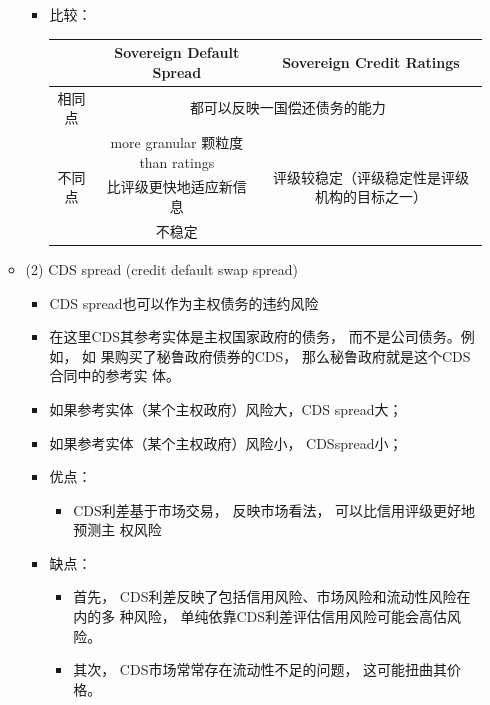 \begin{itemize}
\begin{itemize}
\begin{itemize}
\item 比较：
\begin{center}
    \begin{tabular}{|c|c|c|}
    \hline
    & \textbf{Sovereign Default Spread} & \textbf{Sovereign Credit Ratings} \\
    \hline
    相同点 & \multicolumn{2}{c|}{都可以反映一国偿还债务的能力} \\
    \hline
    \multirow{3}{*}{不同点} & more granular 颗粒度 than ratings & \multirow{3}{*}{评级较稳定（评级稳定性是评级机构的目标之一）} \\
    \cline{2-2}
    & 比评级更快地适应新信息 & \\
    \cline{2-2}
    & 不稳定 & \\
    \hline
    \end{tabular}
    \end{center}
    \end{itemize}


    \item (2) CDS spread (credit default swap spread)
    \begin{itemize}
        \item CDS spread也可以作为主权债务的违约风险
        \item 在这里CDS其参考实体是主权国家政府的债务， 而不是公司债务。例如， 如
        果购买了秘鲁政府债券的CDS， 那么秘鲁政府就是这个CDS合同中的参考实
        体。
        \item 如果参考实体（某个主权政府）风险大，CDS spread大；
        \item 如果参考实体（某个主权政府）风险小， CDSspread小；
        \item  优点：
        \begin{itemize}
            \item  CDS利差基于市场交易， 反映市场看法， 可以比信用评级更好地预测主
        权风险

    \end{itemize}
        \item  缺点：
        \begin{itemize}
            \item  首先， CDS利差反映了包括信用风险、市场风险和流动性风险在内的多
        种风险， 单纯依靠CDS利差评估信用风险可能会高估风险。
        \item   其次， CDS市场常常存在流动性不足的问题， 这可能扭曲其价格。
    \end{itemize}
\end{itemize}

\end{itemize}




\end{itemize}
